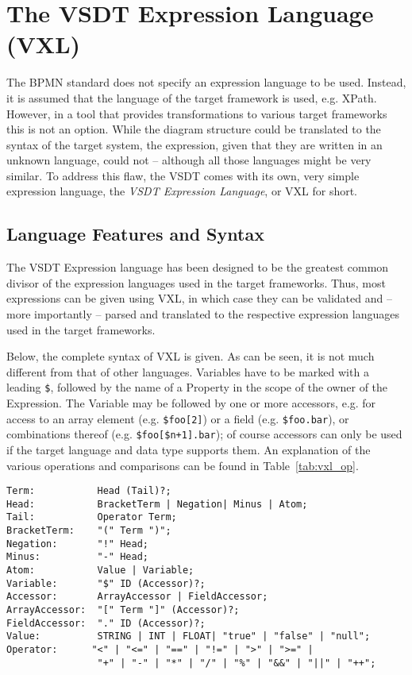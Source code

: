
\chapter{The VSDT Expression Language (VXL)}
\label{sec:vxl}

The BPMN standard does not specify an expression language to be used. Instead, it is assumed that
the language of the target framework is used, e.g. XPath. However, in a tool that provides
transformations to various target frameworks this is not an option. While the diagram structure
could be translated to the syntax of the target system, the expression, given that they are written
in an unknown language, could not -- although all those languages might be very similar. To address
this flaw, the VSDT comes with its own, very simple expression language, the \emph{VSDT Expression
Language}, or VXL for short.


\section{Language Features and Syntax}

The VSDT Expression language has been designed to be the greatest common divisor of the expression
languages used in the target frameworks. Thus, most expressions can be given using VXL, in which
case they can be validated and -- more importantly -- parsed and translated to the respective
expression languages used in the target frameworks.

Below, the complete syntax of VXL is given. As can be seen, it is not much different from that of
other languages. Variables have to be marked with a leading \verb|$|, followed by the name of a
Property in the scope of the owner of the Expression. The Variable may be followed by one or more
accessors, e.g. for access to an array element (e.g. \verb|$foo[2]|) or a field (e.g.
\verb|$foo.bar|), or combinations thereof (e.g. \verb|$foo[$n+1].bar|); of course accessors can only
be used if the target language and data type supports them. An explanation of the various operations
and comparisons can be found in Table~\ref{tab:vxl_op}.

\begin{verbatim}
Term:           Head (Tail)?;
Head:           BracketTerm | Negation| Minus | Atom;
Tail:           Operator Term;
BracketTerm:    "(" Term ")";
Negation:       "!" Head;
Minus:       	"-" Head;
Atom:           Value | Variable;
Variable:       "$" ID (Accessor)?;
Accessor:       ArrayAccessor | FieldAccessor;
ArrayAccessor:  "[" Term "]" (Accessor)?;
FieldAccessor:  "." ID (Accessor)?;
Value:          STRING | INT | FLOAT| "true" | "false" | "null";
Operator:      "<" | "<=" | "==" | "!=" | ">" | ">=" | 
                "+" | "-" | "*" | "/" | "%" | "&&" | "||" | "++";
\end{verbatim}


